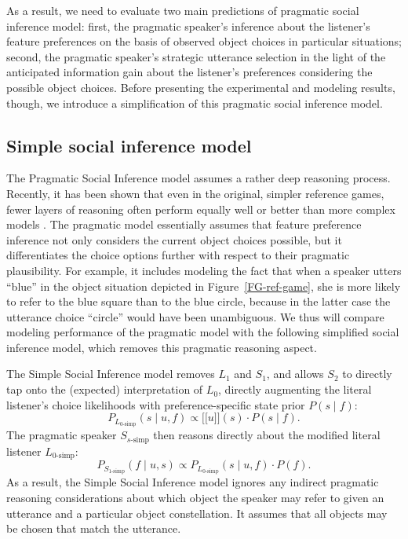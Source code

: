 \documentclass[10pt,a4paper]{article}
\newcommand{\sem}[1]{\mbox{$[\![$#1$]\!]$}}
\begin{document}
As a result, we need to evaluate two main predictions of pragmatic social inference model: 
first, the pragmatic speaker's inference about the listener's feature preferences on the basis of observed object choices in particular situations; 
second, the pragmatic speaker's strategic utterance selection in the light of the anticipated information gain about the listener's preferences considering the possible object choices.
Before presenting the experimental and modeling results, though, we introduce a simplification of this pragmatic social inference model. 


\subsection{Simple social inference model}

The Pragmatic Social Inference model assumes a rather deep reasoning process. 
Recently, it has been shown that even in the original, simpler reference games, fewer layers of reasoning often perform equally well or better than more complex models .
The pragmatic model essentially assumes that feature preference inference not only considers the current object choices possible, but it differentiates the choice options further with respect to their pragmatic plausibility. 
For example, it includes modeling the fact that when a speaker utters ``blue'' in the object situation depicted in Figure~\ref{FG-ref-game}, she is more likely to refer to the blue square than to the blue circle, because in the latter case the utterance choice ``circle'' would have been unambiguous. 
We thus will compare modeling performance of the pragmatic model with the following simplified social inference model, which removes this pragmatic reasoning aspect.


The Simple Social Inference model removes $L_1$ and $S_1$, and allows $S_2$ to directly tap onto the (expected) interpretation of $L_0$, directly augmenting the literal listener's choice likelihoods with preference-specific state prior $P(s\mid f)$:
$$P_{L_{0\textrm{-simp}}}(s\mid u,f) \propto \sem{$u$}(s) \cdot P(s\mid f).$$
The pragmatic speaker $S_{s\textrm{-simp}}$ then reasons directly about the modified literal listener $L_{0\textrm{-simp}}$: 
$$P_{S_{1\textrm{-simp}}}(f\mid u,s) \propto P_{L_{0\textrm{-simp}}}(s\mid u,f) \cdot P(f).$$
As a result, the Simple Social Inference model ignores any indirect pragmatic reasoning considerations about which object the speaker may refer to given an utterance and a particular object constellation.
It  assumes that all objects may be chosen that match the utterance.
\end{document}

